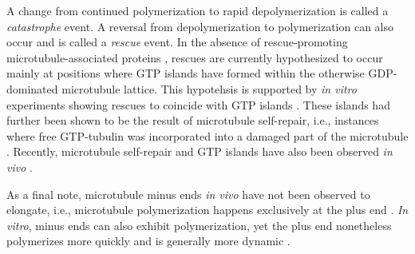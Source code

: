 A change from continued polymerization to rapid depolymerization is called a \textit{catastrophe} event. A reversal from depolymerization to polymerization can also occur and is called a \textit{rescue} event. In the absence of rescue-promoting microtubule-associated proteins , rescues are currently hypothesized to occur mainly at positions where GTP islands have formed within the otherwise GDP-dominated microtubule lattice. This hypotehsis is supported by \textit{in vitro} experiments showing rescues to coincide with GTP islands . These islands had further been shown to be the result of microtubule self-repair, i.e., instances where free GTP-tubulin was incorporated into a damaged part of the microtubule . Recently, microtubule self-repair and GTP islands have also been observed \textit{in vivo} .\par

As a final note, microtubule minus ends \textit{in vivo} have not been observed to elongate, i.e., microtubule polymerization happens exclusively at the plus end \parencite{dammer}. \textit{In vitro}, minus ends can also exhibit polymerization, yet the plus end nonetheless polymerizes more quickly and is generally more dynamic \parencite{Howard2003}. 

